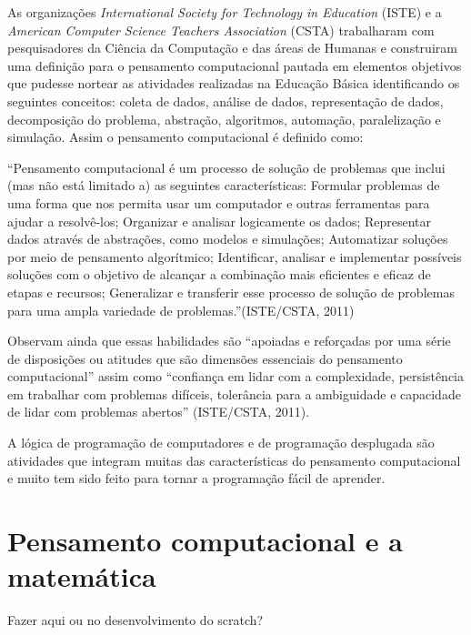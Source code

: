 \documentclass[12pt, openright, a4paper, brazil, openany, oneside]{abntex2}
\begin{document}
As organizações \textit{International Society for Technology in Education} (ISTE) e a \textit{American Computer Science Teachers Association} (CSTA) trabalharam com pesquisadores da Ciência da Computação e das áreas de Humanas e construiram uma definição para o pensamento computacional pautada em elementos objetivos que pudesse nortear as atividades realizadas na Educação Básica identificando os seguintes conceitos: coleta de dados, análise de dados, representação de dados, decomposição do problema, abstração, algoritmos, automação, paralelização e simulação. Assim o pensamento computacional é definido como:

\begin{citacao}

``Pensamento computacional é um processo de solução de problemas que inclui (mas não está limitado a) as seguintes características: Formular problemas de uma forma que nos permita usar um computador e outras ferramentas para ajudar a resolvê-los; Organizar e analisar logicamente os dados; Representar dados através de abstrações, como modelos e simulações; Automatizar soluções por meio de pensamento algorítmico; Identificar, analisar e implementar possíveis soluções com o objetivo de alcançar a combinação mais eficientes e eficaz de etapas e recursos; Generalizar e transferir esse processo de solução de problemas para uma ampla variedade de problemas.''\cite{iste/csta}(ISTE/CSTA, 2011)

\end{citacao}

Observam ainda que essas habilidades são ``apoiadas e reforçadas por uma série de disposições ou atitudes que são dimensões essenciais do pensamento computacional'' assim como ``confiança em lidar com a complexidade, persistência em trabalhar com problemas difíceis, tolerância para a ambiguidade e capacidade de lidar com problemas abertos''\cite{iste/csta} (ISTE/CSTA, 2011).

A lógica de programação de computadores e de programação desplugada são atividades que integram muitas das características do pensamento computacional e muito tem sido feito para tornar a programação fácil de aprender.

\chapter*{Pensamento computacional e a matemática}

Fazer aqui ou no desenvolvimento do scratch?
\end{document}
